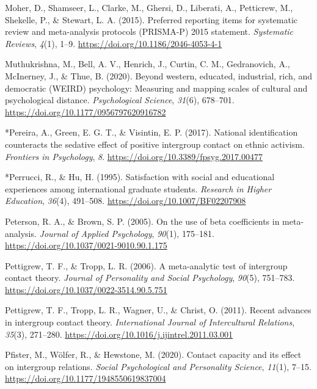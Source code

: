 \documentclass[12pt, letterpaper]{article}
\begin{document}
\leavevmode\hypertarget{ref-moher_preferred_2015}{}%
Moher, D., Shamseer, L., Clarke, M., Ghersi, D., Liberati, A.,
Petticrew, M., Shekelle, P., \& Stewart, L. A. (2015). Preferred
reporting items for systematic review and meta-analysis protocols
(PRISMA-P) 2015 statement. \emph{Systematic Reviews}, \emph{4}(1), 1--9.
\url{https://doi.org/10.1186/2046-4053-4-1}

\leavevmode\hypertarget{ref-muthukrishna_beyond_2020}{}%
Muthukrishna, M., Bell, A. V., Henrich, J., Curtin, C. M., Gedranovich,
A., McInerney, J., \& Thue, B. (2020). Beyond western, educated,
industrial, rich, and democratic (WEIRD) psychology: Measuring and
mapping scales of cultural and psychological distance.
\emph{Psychological Science}, \emph{31}(6), 678--701.
\url{https://doi.org/10.1177/0956797620916782}

\leavevmode\hypertarget{ref-4004}{}%
*Pereira, A., Green, E. G. T., \& Visintin, E. P. (2017). National
identification counteracts the sedative effect of positive intergroup
contact on ethnic activism. \emph{Frontiers in Psychology}, \emph{8}.
\url{https://doi.org/10.3389/fpsyg.2017.00477}

\leavevmode\hypertarget{ref-823}{}%
*Perrucci, R., \& Hu, H. (1995). Satisfaction with social and
educational experiences among international graduate students.
\emph{Research in Higher Education}, \emph{36}(4), 491--508.
\url{https://doi.org/10.1007/BF02207908}

\leavevmode\hypertarget{ref-peterson_use_2005}{}%
Peterson, R. A., \& Brown, S. P. (2005). On the use of beta coefficients
in meta-analysis. \emph{Journal of Applied Psychology}, \emph{90}(1),
175--181. \url{https://doi.org/10.1037/0021-9010.90.1.175}

\leavevmode\hypertarget{ref-pettigrew_meta-analytic_2006}{}%
Pettigrew, T. F., \& Tropp, L. R. (2006). A meta-analytic test of
intergroup contact theory. \emph{Journal of Personality and Social
Psychology}, \emph{90}(5), 751--783.
\url{https://doi.org/10.1037/0022-3514.90.5.751}

\leavevmode\hypertarget{ref-pettigrew_recent_2011}{}%
Pettigrew, T. F., Tropp, L. R., Wagner, U., \& Christ, O. (2011). Recent
advances in intergroup contact theory. \emph{International Journal of
Intercultural Relations}, \emph{35}(3), 271--280.
\url{https://doi.org/10.1016/j.ijintrel.2011.03.001}

\leavevmode\hypertarget{ref-pfister_contact_2020}{}%
Pfister, M., Wölfer, R., \& Hewstone, M. (2020). Contact capacity and
its effect on intergroup relations. \emph{Social Psychological and
Personality Science}, \emph{11}(1), 7--15.
\url{https://doi.org/10.1177/1948550619837004}
\end{document}
